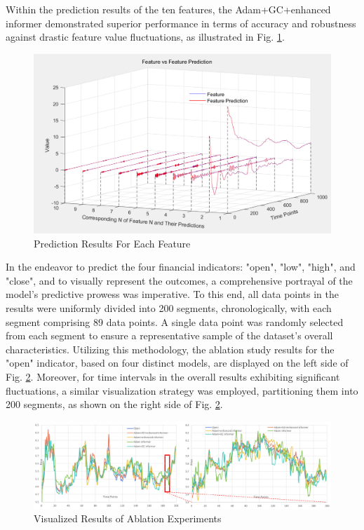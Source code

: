 \documentclass[sn-mathphys,Numbered]{sn-jnl}
\theoremstyle{thmstyleone}%
\theoremstyle{thmstyletwo}%
\theoremstyle{thmstylethree}%
\begin{document}
Within the prediction results of the ten features, the Adam+GC+enhanced informer demonstrated superior performance in terms of accuracy and robustness against drastic feature value fluctuations, as illustrated in Fig. \ref{features}.
\begin{figure}[h]
    \centering
    \includegraphics[width=1\textwidth]{pngs/features.png}
    \caption{ Prediction Results For Each Feature}
    \label{features}
\end{figure}
In the endeavor to predict the four financial indicators: "open", "low", "high", and "close", and to visually represent the outcomes, a comprehensive portrayal of the model's predictive prowess was imperative. To this end, all data points in the results were uniformly divided into 200 segments, chronologically, with each segment comprising 89 data points. A single data point was randomly selected from each segment to ensure a representative sample of the dataset's overall characteristics. Utilizing this methodology, the ablation study results for the "open" indicator, based on four distinct models, are displayed on the left side of Fig. \ref{disso}. Moreover, for time intervals in the overall results exhibiting significant fluctuations, a similar visualization strategy was employed, partitioning them into 200 segments, as shown on the right side of Fig. \ref{disso}.

\begin{figure}[h]
    \centering
    \includegraphics[width=1\textwidth]{pngs/disso.png}
    \caption{Visualized Results of Ablation Experiments}
    \label{disso}
\end{figure}
\end{document}
